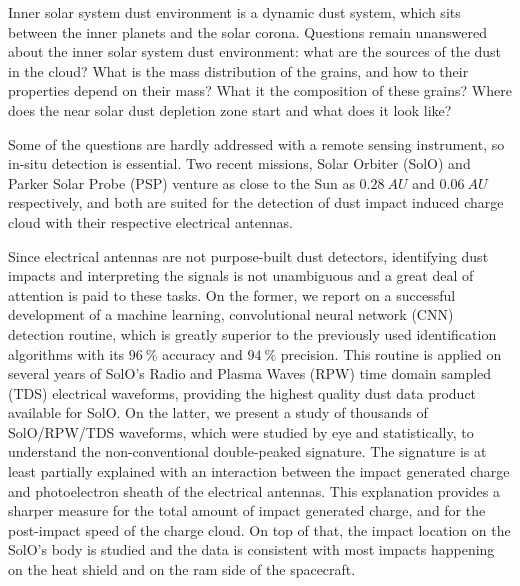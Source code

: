 Inner solar system dust environment is a dynamic dust system, which sits between the inner planets and the solar corona. Questions remain unanswered about the inner solar system dust environment: what are the sources of the dust in the cloud? What is the mass distribution of the grains, and how to their properties depend on their mass? What it the composition of these grains? Where does the near solar dust depletion zone start and what does it look like? 

Some of the questions are hardly addressed with a remote sensing instrument, so in-situ detection is essential. Two recent missions, Solar Orbiter (SolO) and Parker Solar Probe (PSP) venture as close to the Sun as $\SI{0.28}{AU}$ and $\SI{0.06}{AU}$ respectively, and both are suited for the detection of dust impact induced charge cloud with their respective electrical antennas. 

Since electrical antennas are not purpose-built dust detectors, identifying dust impacts and interpreting the signals is not unambiguous and a great deal of attention is paid to these tasks. On the former, we report on a successful development of a machine learning, convolutional neural network (CNN) detection routine, which is greatly superior to the previously used identification algorithms with its $\SI{96}{\%}$ accuracy and $\SI{94}{\%}$ precision. This routine is applied on several years of SolO's Radio and Plasma Waves (RPW) time domain sampled (TDS) electrical waveforms, providing the highest quality dust data product available for SolO. On the latter, we present a study of thousands of SolO/RPW/TDS waveforms, which were studied by eye and statistically, to understand the non-conventional double-peaked signature. The signature is at least partially explained with an interaction between the impact generated charge and photoelectron sheath of the electrical antennas. This explanation provides a sharper measure for the total amount of impact generated charge, and for the post-impact speed of the charge cloud. On top of that, the impact location on the SolO's body is studied and the data is consistent with most impacts happening on the heat shield and on the ram side of the spacecraft.

